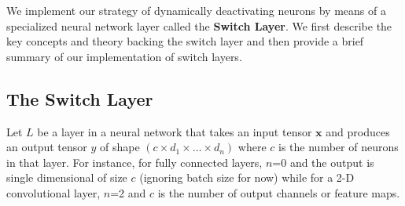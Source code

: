 We implement our strategy of dynamically deactivating neurons by means of a 
specialized neural network layer called the \textbf{Switch Layer}.
We first describe the key concepts and theory backing the switch layer and then
provide a brief summary of our implementation of switch layers.


\subsection{The Switch Layer}


Let $L$ be a layer in a neural network that takes an input tensor $\bm{x}$ and 
produces an output tensor $y$ of shape $\left(c \times d_1 \times \dots \times 
d_n\right)$ where $c$ is the number of neurons in that layer.
For instance, for fully connected layers, $n$=0 and the output is single 
dimensional of size $c$ (ignoring batch size for now) while for a 2-D 
convolutional layer, $n$=2 and $c$ is the number of output channels or feature 
maps.

